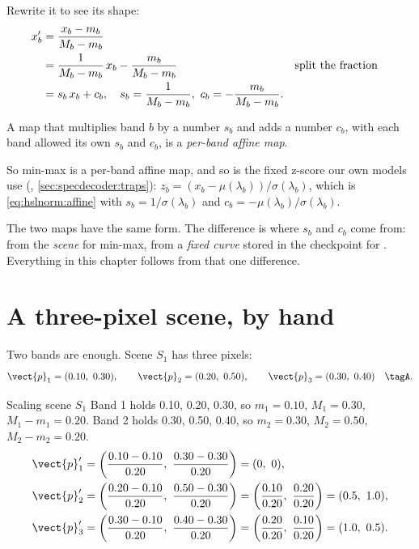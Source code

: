 Rewrite it to see its shape:
\begin{align}
x'_b &= \frac{x_b-m_b}{M_b-m_b} \notag\\
&= \frac{1}{M_b-m_b}\,x_b-\frac{m_b}{M_b-m_b} && \text{split the fraction}\notag\\
&= s_b\,x_b+c_b, \quad s_b=\frac{1}{M_b-m_b},\ c_b=-\frac{m_b}{M_b-m_b}. \label{eq:hslnorm:affine}
\end{align}
\begin{definition}
A map that multiplies band $b$ by a number $s_b$ and adds a number $c_b$, with each band allowed its own $s_b$ and
$c_b$, is a \emph{per-band affine map}.
\end{definition}
So min-max is a per-band affine map, and so is the fixed z-score our own models use
(, \cref{sec:specdecoder:traps}): $z_b=(x_b-\mu(\lambda_b))/\sigma(\lambda_b)$, which is
\cref{eq:hslnorm:affine} with $s_b=1/\sigma(\lambda_b)$ and $c_b=-\mu(\lambda_b)/\sigma(\lambda_b)$.

\begin{keypoint}
The two maps have the same form. The difference is where $s_b$ and $c_b$ come from: from the \emph{scene} for min-max,
from a \emph{fixed curve} stored in the checkpoint for . Everything in this chapter follows from
that one difference.
\end{keypoint}

\section{A three-pixel scene, by hand}\label{sec:hslnorm:toy}

Two bands are enough. Scene $S_1$ has three pixels:
\[
\vect{p}_1=(0.10,\ 0.30),\qquad \vect{p}_2=(0.20,\ 0.50),\qquad \vect{p}_3=(0.30,\ 0.40)\quad\tagA .
\]

\begin{worked}[label={we:hslnorm:s1}]{Scaling scene $S_1$}
Band 1 holds 0.10, 0.20, 0.30, so $m_1=0.10$, $M_1=0.30$, $M_1-m_1=0.20$. Band 2 holds 0.30, 0.50, 0.40, so $m_2=0.30$,
$M_2=0.50$, $M_2-m_2=0.20$.
\begin{align*}
\vect{p}'_1 &= \left(\frac{0.10-0.10}{0.20},\ \frac{0.30-0.30}{0.20}\right) = (0,\ 0),\\
\vect{p}'_2 &= \left(\frac{0.20-0.10}{0.20},\ \frac{0.50-0.30}{0.20}\right) = \left(\frac{0.10}{0.20},\ \frac{0.20}{0.20}\right) = (0.5,\ 1.0),\\
\vect{p}'_3 &= \left(\frac{0.30-0.10}{0.20},\ \frac{0.40-0.30}{0.20}\right) = \left(\frac{0.20}{0.20},\ \frac{0.10}{0.20}\right) = (1.0,\ 0.5).
\end{align*}
\end{worked}

